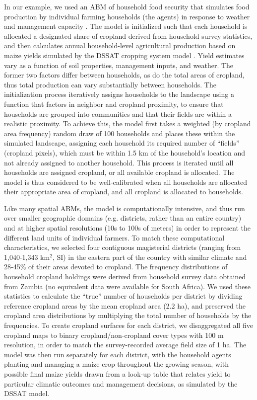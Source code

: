 \documentclass[a4paper]{article}
\begin{document}
In our example, we used an ABM of household food security that simulates food production by individual farming households (the agents) in response to weather and management capacity \citep{chen_dependency_2013}. The model is initialized such that each household is allocated a designated share of cropland derived from household survey statistics, and then calculates annual household-level agricultural production based on maize yields simulated by the DSSAT cropping system model \citep{jones_modelling_2003}. Yield estimates vary as a function of soil properties, management inputs, and weather. The former two factors differ between households, as do the total areas of cropland, thus total production can vary substantially between households. The initialization process iteratively assigns households to the landscape using a function that factors in neighbor and cropland proximity, to ensure that households are grouped into communities and that their fields are within a realistic proximity. To achieve this, the model first takes a weighted (by cropland area frequency) random draw of 100 households and places these within the simulated landscape, assigning each household its required number of ``fields'' (cropland pixels), which must be within 1.5 km of the household's location and not already assigned to another household. This process is iterated until all households are assigned cropland, or all available cropland is allocated. The model is thus considered to be well-calibrated when all households are allocated their appropriate area of cropland, and all cropland is allocated to households. 

Like many spatial ABMs, the model is computationally intensive, and thus run over smaller geographic domains (e.g. districts, rather than an entire country) and at higher spatial resolutions (10s to 100s of meters) in order to represent the different land units of individual farmers. To match these computational characteristics, we selected four contiguous magisterial districts (ranging from 1,040-1,343 km$^2$, SI) in the eastern part of the country with similar climate and 28-45\% of their areas devoted to cropland. The frequency distributions of household cropland holdings were derived from household survey data obtained from Zambia (no equivalent data were available for South Africa). We used these statistics to calculate the ``true'' number of households per district by dividing reference cropland areas by the mean cropland area (2.2 ha), and preserved the cropland area distributions by multiplying the total number of households by the frequencies. To create cropland surfaces for each district, we disaggregated all five cropland maps to binary cropland/non-cropland cover types with 100 m resolution, in order to match the survey-recorded average field size of 1 ha. The model was then run separately for each district, with the household agents planting and managing a maize crop throughout the growing season, with possible final maize yields drawn from a look-up table that relates yield to particular climatic outcomes and management decisions, as simulated by the DSSAT model. 
\end{document}

